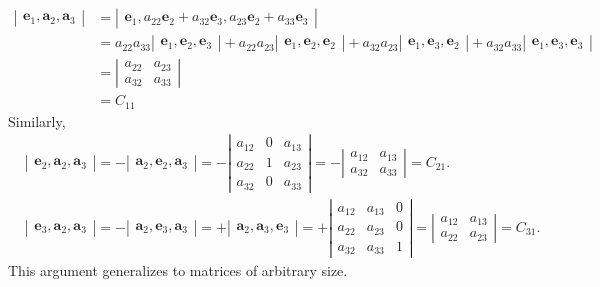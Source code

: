 \documentclass[12pt]{article}
\newcommand{\ba}{\mathbf{a}}
\newcommand{\be}{\mathbf{e}}
\newcommand{\vmat}[1]{\left|\begin{matrix}#1\end{matrix}\right|}
\begin{document}
\begin{align*}
  \vmat{\be_1, \ba_2, \ba_3} &= \vmat{\be_1,a_{22}
    \be_2 + a_{32} \be_3, a_{23} \be_2 + a_{33} \be_3} \\
  &= a_{22} a_{33} \vmat{\be_1, \be_2, \be_3}  + a_{22} a_{23}
  \vmat{\be_1, \be_2, \be_2} + a_{32} a_{23} \vmat{\be_1, \be_3, \be_2}
  + a_{32} a_{33} \vmat{\be_1, \be_3, \be_3} \\
  &= \vmat{a_{22} & a_{23} \\ a_{32} & a_{33}}\\
  &= C_{11}
\end{align*}
Similarly, 
\begin{align*}
  &\vmat{\be_2, \ba_2, \ba_3} = -\vmat{\ba_2, \be_2, \ba_3} = -
  \vmat{a_{12} & 0& a_{13}\\a_{22} & 1 & a_{23} \\ a_{32}& 0 &
    a_{33}}= - \vmat{a_{12} & a_{13} \\ a_{32} & a_{33}} = C_{21}.\\
  & \vmat{\be_3, \ba_2, \ba_3} = -\vmat{\ba_2, \be_3, \ba_3} = +
  \vmat{\ba_2,\ba_3, \be_3}
  = +
  \vmat{a_{12} &  a_{13}&0\\a_{22} &  a_{23}&0 \\ a_{32}&  a_{33}&1}= 
  \vmat{a_{12} & a_{13} \\ a_{22} & a_{23}} = C_{31}.
\end{align*}
This argument generalizes to matrices of arbitrary size.
\end{document}
